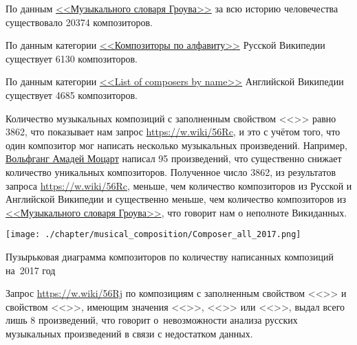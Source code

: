 По данным \href{https://ru.wikipedia.org/wiki/Музыкальный_словарь_Гроува}{<<Музыкального словаря Гроува>>} за всю историю человечества существовало \num{20374} композиторов.


По данным категории \href{https://ru.wikipedia.org/wiki/Категория:Композиторы_по_алфавиту}{<<Композиторы по алфавиту>>} Русской Википедии существует \num{6130} композиторов.


По данным категории \href{https://en.wikipedia.org/wiki/List_of_composers_by_name}{<<List of composers by name>>} Английской Википедии существует \num{4685} композиторов.


Количество музыкальных композиций с заполненным свойством <<>> равно \num{3862}, что показывает нам запрос \href{https://w.wiki/56Rc}{https://w.wiki/56Rc}, и это с учётом того, что один композитор мог написать несколько музыкальных произведений. Например, \href{https://ru.wikipedia.org/wiki/Моцарт,_Вольфганг_Амадей}{Вольфганг Амадей Моцарт} написал \num{95} произведений, что существенно снижает количество уникальных композиторов. Полученное число \num{3862}, из результатов запроса \href{https://w.wiki/56Rc}{https://w.wiki/56Rc}, меньше, чем количество композиторов из Русской и Английской Википедии и существенно меньше, чем количество композиторов из \href{https://ru.wikipedia.org/wiki/Музыкальный_словарь_Гроува}{<<Музыкального словаря Гроува>>}, что говорит нам о неполноте Викиданных.

\begin{marginfigure}[1\baselineskip]
  \texttt{[image: ./chapter/musical\_composition/Composer\_all\_2017.png]}
  \vspace{-7pt}
  \caption[Пузырьковая диаграмма композиторов по количеству написанных композиций на~2017 год]{Пузырьковая диаграмма композиторов по количеству написанных композиций на~2017 год}%
  \label{fig:Composers2017}%
\end{marginfigure}

Запрос \href{https://w.wiki/56Rj}{https://w.wiki/56Rj} по композициям с заполненным свойством <<>> и свойством <<>>, имеющим значения <<>>, <<>> или <<>>, выдал всего лишь \num{8} произведений, что говорит о~невозможности анализа русских музыкальных произведений в связи с недостатком данных.

